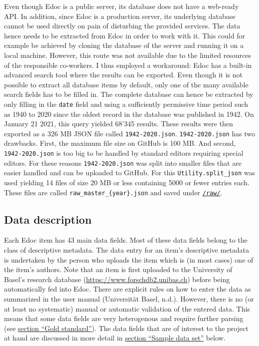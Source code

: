 Even though Edoc is a public server, its database does not have a
web-ready API. In addition, since Edoc is a production server, its
underlying database cannot be used directly on pain of disturbing the
provided services. The data hence needs to be extracted from Edoc in
order to work with it. This could for example be achieved by cloning the
database of the server and running it on a local machine. However, this
route was not available due to the limited resources of the responsible
co-workers. I thus employed a workaround: Edoc has a built-in advanced
search tool where the results can be exported. Even though it is not
possible to extract all database items by default, only one of the many
available search fields has to be filled in. The complete database can
hence be extracted by only filling in the \texttt{date} field and using
a sufficiently permissive time period such as 1940 to 2020 since the
oldest record in the database was published in 1942. On January 21 2021,
this query yielded 68'345 results. These results were then exported as a
326 MB JSON file called \texttt{1942-2020.json}. \texttt{1942-2020.json}
has two drawbacks. First, the maximum file size on GitHub is 100 MB. And
second, \texttt{1942-2020.json} is too big to be handled by standard
editors requiring special editors. For these reasons
\texttt{1942-2020.json} was split into smaller files that are easier
handled and can be uploaded to GitHub. For this
\texttt{Utility.split\_json} was used yielding 14 files of size 20 MB or
less containing 5000 or fewer entries each. These files are called
\texttt{raw\_master\_\{year\}.json} and saved under
\href{https://github.com/MHindermann/mas/tree/main/files/raw}{\texttt{/raw/}}.

\hypertarget{data-description}{%
\subsection{Data description}\label{data-description}}

Each Edoc item has 43 main data fields. Most of these data fields belong
to the class of descriptive metadata. The data entry for an item's
descriptive metadata is undertaken by the person who uploads the item
which is (in most cases) one of the item's authors. Note that an item is
first uploaded to the University of Basel's research database
(\url{https://www.forschdb2.unibas.ch}) before being automatically fed
into Edoc. There are explicit rules on how to enter the data as
summarized in the user manual (Universität Basel, n.d.). However, there
is no (or at least no systematic) manual or automatic validation of the
entered data. This means that some data fields are very heterogenous and
require further parsing (see \protect\hyperlink{gold-standard}{section
``Gold standard''}). The data fields that are of interest to the project
at hand are discussed in more detail in
\protect\hyperlink{sample-data-set}{section ``Sample data set''} below.

